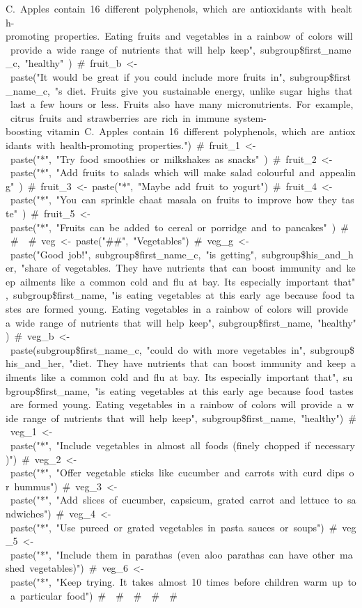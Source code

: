 \documentclass[]{article}
\begin{document}
C.\ Apples\ contain\ 16\ different\ polyphenols,\ which\ are\ antioxidants\ with\ health-promoting\ properties.\ Eating\ fruits\ and\ vegetables\ in\ a\ rainbow\ of\ colors\ will\ provide\ a\ wide\ range\ of\ nutrients\ that\ will\ help\ keep",\ subgroup\$first\_name\_c,\ "healthy"\ )\ \#\ fruit\_b\ \textless{}-\ paste("It\ would\ be\ great\ if\ you\ could\ include\ more\ fruits\ in",\ subgroup\$first\_name\_c,\ "\textquotesingle{}s\ diet.\ Fruits\ give\ you\ sustainable\ energy,\ unlike\ sugar\ highs\ that\ last\ a\ few\ hours\ or\ less.\ Fruits\ also\ have\ many\ micronutrients.\ For\ example,\ citrus\ fruits\ and\ strawberries\ are\ rich\ in\ immune\ system-boosting\ vitamin\ C.\ Apples\ contain\ 16\ different\ polyphenols,\ which\ are\ antioxidants\ with\ health-promoting\ properties.")\ \#\ fruit\_1\ \textless{}-\ paste("*",\ "Try\ food\ smoothies\ or\ milkshakes\ as\ snacks"\ )\ \#\ fruit\_2\ \textless{}-\ paste("*",\ "Add\ fruits\ to\ salads\ which\ will\ make\ salad\ colourful\ and\ appealing"\ )\ \#\ fruit\_3\ \textless{}-\ paste("*",\ "Maybe\ add\ fruit\ to\ yogurt")\ \#\ fruit\_4\ \textless{}-\ paste("*",\ "You\ can\ sprinkle\ chaat\ masala\ on\ fruits\ to\ improve\ how\ they\ taste"\ )\ \#\ fruit\_5\ \textless{}-\ paste("*",\ "Fruits\ can\ be\ added\ to\ cereal\ or\ porridge\ and\ to\ pancakes"\ )\ \#\ \ \#\ \ \#\ veg\ \textless{}-\ paste("\#\#",\ "Vegetables")\ \#\ veg\_g\ \textless{}-\ paste("Good\ job!",\ subgroup\$first\_name\_c,\ "is\ getting",\ subgroup\$his\_and\_her,\ "share\ of\ vegetables.\ They\ have\ nutrients\ that\ can\ boost\ immunity\ and\ keep\ ailments\ like\ a\ common\ cold\ and\ flu\ at\ bay.\ It\textquotesingle{}s\ especially\ important\ that",\ subgroup\$first\_name,\ "is\ eating\ vegetables\ at\ this\ early\ age\ because\ food\ tastes\ are\ formed\ young.\ Eating\ vegetables\ in\ a\ rainbow\ of\ colors\ will\ provide\ a\ wide\ range\ of\ nutrients\ that\ will\ help\ keep",\ subgroup\$first\_name,\ "healthy")\ \#\ veg\_b\ \textless{}-\ paste(subgroup\$first\_name\_c,\ "could\ do\ with\ more\ vegetables\ in",\ subgroup\$his\_and\_her,\ "diet.\ They\ have\ nutrients\ that\ can\ boost\ immunity\ and\ keep\ ailments\ like\ a\ common\ cold\ and\ flu\ at\ bay.\ It\textquotesingle{}s\ especially\ important\ that",\ subgroup\$first\_name,\ "is\ eating\ vegetables\ at\ this\ early\ age\ because\ food\ tastes\ are\ formed\ young.\ Eating\ vegetables\ in\ a\ rainbow\ of\ colors\ will\ provide\ a\ wide\ range\ of\ nutrients\ that\ will\ help\ keep",\ subgroup\$first\_name,\ "healthy")\ \#\ veg\_1\ \textless{}-\ paste("*",\ "Include\ vegetables\ in\ almost\ all\ foods\ (finely\ chopped\ if\ necessary)")\ \#\ veg\_2\ \textless{}-\ paste("*",\ "Offer\ vegetable\ sticks\ like\ cucumber\ and\ carrots\ with\ curd\ dips\ or\ hummus")\ \#\ veg\_3\ \textless{}-\ paste("*",\ "Add\ slices\ of\ cucumber,\ capsicum,\ grated\ carrot\ and\ lettuce\ to\ sandwiches")\ \#\ veg\_4\ \textless{}-\ paste("*",\ "Use\ pureed\ or\ grated\ vegetables\ in\ pasta\ sauces\ or\ soups")\ \#\ veg\_5\ \textless{}-\ paste("*",\ "Include\ them\ in\ parathas\ (even\ aloo\ parathas\ can\ have\ other\ mashed\ vegetables)")\ \#\ veg\_6\ \textless{}-\ paste("*",\ "Keep\ trying.\ It\ takes\ almost\ 10\ times\ before\ children\ warm\ up\ to\ a\ particular\ food")\ \#\ \ \#\ \ \#\ \ \#\ \ \#\ 
\end{document}
